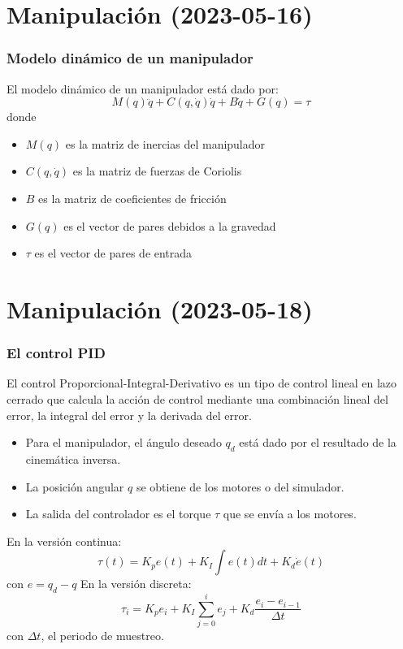 \section{Manipulación (2023-05-16)}

\begin{frame}\frametitle{Modelo dinámico de un manipulador}
  El modelo dinámico de un manipulador está dado por:
  \[M(q)\ddot{q} + C(q,\dot{q})\dot{q} + B\dot{q} + G(q) = \tau\]
  donde
  \begin{itemize}
  \item $M(q)$ es la matriz de inercias del manipulador
  \item $C(q,\dot{q})$ es la matriz de fuerzas de Coriolis
  \item $B$ es la matriz de coeficientes de fricción
  \item $G(q)$ es el vector de pares debidos a la gravedad
  \item $\tau$ es el vector de pares de entrada
  \end{itemize}
\end{frame}

\section{Manipulación (2023-05-18)}

\begin{frame}\frametitle{El control PID}
  El control Proporcional-Integral-Derivativo es un tipo de control lineal en lazo cerrado que calcula la acción de control mediante una combinación lineal del error, la integral del error y la derivada del error.
  \begin{itemize}
  \item Para el manipulador, el ángulo deseado $q_d$ está dado por el resultado de la cinemática inversa. 
  \item La posición angular $q$ se obtiene de los motores o del simulador.
  \item La salida del controlador es el torque $\tau$ que se envía a los motores.
  \end{itemize}
  En la versión continua:
  \[\tau(t) = K_p e(t) + K_I \int e(t)dt + K_d \dot{e}(t)\]
  con $e = q_d - q$
  En la versión discreta:
  \[\tau_i = K_p e_i + K_I\sum_{j=0}^i e_j + K_d\frac{e_i - e_{i-1}}{\Delta t}\]
  con $\Delta t$, el periodo de muestreo. 
\end{frame}

